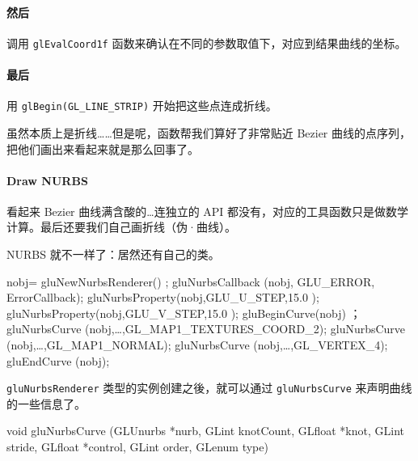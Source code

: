 \documentclass[
]{article}
\newenvironment{Shaded}{}{}
\newcommand{\DataTypeTok}[1]{\textcolor[rgb]{0.56,0.13,0.00}{#1}}
\newcommand{\FloatTok}[1]{\textcolor[rgb]{0.25,0.63,0.44}{#1}}
\newcommand{\NormalTok}[1]{#1}
\begin{document}
\hypertarget{header-n48}{%
\paragraph{然后}\label{header-n48}}

调用 \texttt{glEvalCoord1f}
函数来确认在不同的参数取值下，对应到结果曲线的坐标。

\hypertarget{header-n50}{%
\paragraph{最后}\label{header-n50}}

用 \texttt{glBegin(GL\_LINE\_STRIP)} 开始把这些点连成折线。

虽然本质上是折线\ldots\ldots 但是呢，函数帮我们算好了非常贴近 Bezier
曲线的点序列，把他们画出来看起来就是那么回事了。

\hypertarget{header-n53}{%
\paragraph{Draw NURBS}\label{header-n53}}

看起来 Bezier 曲线满含酸的\ldots 连独立的 API
都没有，对应的工具函数只是做数学计算。最后还要我们自己画折线（伪·曲线）。

NURBS 就不一样了：居然还有自己的类。

\begin{Shaded}
\begin{Highlighting}[]
\NormalTok{nobj= gluNewNurbsRenderer() ;}
\NormalTok{gluNurbsCallback (nobj, GLU_ERROR, ErrorCallback);}
\NormalTok{gluNurbsProperty(nobj,GLU_U_STEP,}\FloatTok{15.0}\NormalTok{ );}
\NormalTok{gluNurbsProperty(nobj,GLU_V_STEP,}\FloatTok{15.0}\NormalTok{ );}
\NormalTok{gluBeginCurve(nobj) ；}
\NormalTok{		gluNurbsCurve (nobj,…,GL_MAP1_TEXTURES_COORD_2); }
\NormalTok{		gluNurbsCurve (nobj,…,GL_MAP1_NORMAL);}
\NormalTok{		gluNurbsCurve (nobj,…,GL_VERTEX_4);}
\NormalTok{gluEndCurve (nobj);}
\end{Highlighting}
\end{Shaded}

\texttt{gluNurbsRenderer} 类型的实例创建之後，就可以通过
\texttt{gluNurbsCurve} 来声明曲线的一些信息了。

\begin{Shaded}
\begin{Highlighting}[]
\DataTypeTok{void}\NormalTok{ gluNurbsCurve (GLUnurbs *nurb,}
\NormalTok{                    GLint knotCount, }
\NormalTok{                    GLfloat *knot, }
\NormalTok{                    GLint stride, }
\NormalTok{                    GLfloat *control, }
\NormalTok{                    GLint order, }
\NormalTok{                    GLenum type)}
\end{Highlighting}
\end{Shaded}
\end{document}
